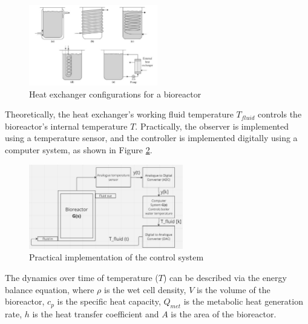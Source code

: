 \begin{figure}[h]
    \centering
    \includegraphics[width=0.5\textwidth]{eunsoo/E-1-2-heat-exchangers.png}
    \hfill
    \caption{Heat exchanger configurations for a bioreactor \cite{E-Doran2013}}
    \label{figure:E-1-2-heat-exchangers}
\end{figure}

\vspace{-5mm}
Theoretically, the heat exchanger's working fluid temperature $T_{fluid}$ controls the bioreactor's internal temperature $T$. Practically, the observer is implemented using a temperature sensor, and the controller is implemented digitally using a computer system, as shown in Figure \ref{figure:E-1-3-digital-control-system}.

\begin{figure}[h]
    \centering
    \includegraphics[width=0.6\textwidth]{eunsoo/E-1-3-digital-control-system.png}
    \hfill
    \caption{Practical implementation of the control system}
    \label{figure:E-1-3-digital-control-system}
\end{figure}

\newpage


The dynamics over time of temperature ($T$) can be described via the energy balance equation, where $\rho$ is the wet cell density, $V$ is the volume of the bioreactor, $c_p$ is the specific heat capacity, $Q_{met}$ is the metabolic heat generation rate, $h$ is the heat transfer coefficient and $A$ is the area of the bioreactor.

